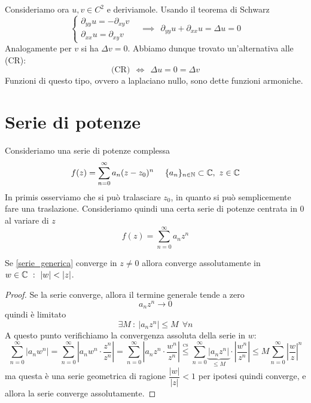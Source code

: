 Consideriamo ora $u, v\in C^{2}$ e deriviamole. Usando il teorema di Schwarz
\begin{equation*}
\begin{cases}
\partial_{yy} u = - \partial_{xy} v\ \ \ \ \\
\partial_{xx} u = \partial_{xy} v
\end{cases} \implies \ \ \partial_{yy} u + \partial_{xx} u = \Delta u = 0
\end{equation*}
Analogamente per $v$ si ha $\Delta v = 0$. Abbiamo dunque trovato un'alternativa alle (CR):
$$
\text{(CR)} \ \ \iff \ \ \Delta u = 0 = \Delta v
$$
Funzioni di questo tipo, ovvero a laplaciano nullo, sono dette funzioni armoniche.


\section{Serie di potenze}

Consideriamo una serie di potenze complessa
\begin{equation*}
f(z) = \sum\limits^{\infty}_{n = 0} a_{n}(z - z_{0})^{n} \ \ \ \ \{a_{n}\}_{n\in\mathbb{N}} \subset \mathbb{C},\ z\in \mathbb{C}
\end{equation*}
In primis osserviamo che si può tralasciare $z_{0}$, in quanto si può semplicemente fare una traslazione. Consideriamo quindi una certa serie di potenze centrata in $0$ al variare di $z$
\begin{equation}
\label{serie_generica}
f(z) = \sum\limits^{\infty}_{n = 0} a_{n} z^{n}
\end{equation}

\begin{thm}
Se \eqref{serie_generica} converge in $z \neq 0$ allora converge assolutamente in $w\in\CC\ :\ |w|<|z|$.
\end{thm}


\begin{proof}
Se la serie converge, allora il termine generale tende a zero
\begin{equation*}
a_{n} z^{n}\rightarrow 0
\end{equation*}
quindi è limitato
\begin{equation*}
\exists M\ :\ \left| a_{n} z^{n}\right| \leq M\ \ \forall n
\end{equation*}
A questo punto verifichiamo la convergenza assoluta della serie in $w$:
\begin{equation*}
\sum\limits^{\infty}_{n = 0}\left| a_{n} w^{n}\right| = \sum\limits^{\infty}_{n = 0} \left|a_{n} w^{n} \cdot \frac{z^n}{z^n} \right| = \sum\limits^{\infty}_{n = 0} \left|a_{n} z^{n} \cdot \frac{w^n}{z^n} \right| \overset{\underset{\text{CS}}{}}{\leq} \sum\limits^{\infty}_{n = 0}\underbrace{\left| a_{n} z^{n}\right|}_{\leq M}\cdot \left|\frac{w^n}{z^n}\right| \leq M\sum\limits^{\infty}_{n = 0}\left|\frac{w}{z}\right|^n
\end{equation*}
ma questa è una serie geometrica di ragione $\dfrac{|w|}{| z|} < 1$ per ipotesi quindi converge, e allora la serie converge assolutamente. 
\end{proof}

